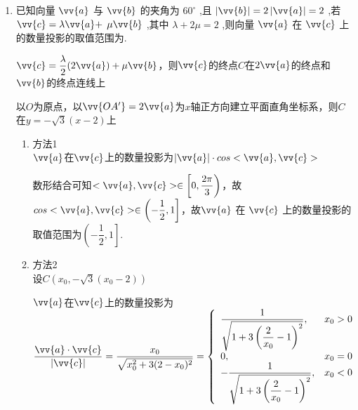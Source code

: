 
\begin{enumerate}
    \item 已知向量 $\vv{a}$ 与 $\vv{b}$ 的夹角为 ${60}^{ \circ  }$ ,且 $\left| \vv{b}\right|  = 2\left| \vv{a}\right|  = 2$ ,若 $\vv{c} = \lambda \vv{a} +$  $\mu \vv{b}$ ,其中 $\lambda  + {2\mu } = 2$ ,则向量 $\vv{a}$ 在 $\vv{c}$ 上的数量投影的取值范围为\blkda{$\left(-\dfrac{1}{2}, 1\right]$}.
    \begin{jieda}
        $\vv{c} = \dfrac{\lambda}{2}(2\vv{a})+\mu \vv{b}$，则$\vv{c}$的终点$C$在$2\vv{a}$的终点和$\vv{b}$的终点连线上

        以$O$为原点，以$\vv{OA'} = 2\vv{a}$为$x$轴正方向建立平面直角坐标系，则$C$在$y = -\sqrt{3}(x-2)$上
        \begin{enumerate}
            \item 方法1 \\
            $\vv{a}$在$\vv{c}$上的数量投影为$|\vv{a}|\cdot cos<\vv{a}, \vv{c}>$
            
            数形结合可知$<\vv{a}, \vv{c}> \in \left[0, \dfrac{2\pi}{3}\right)$，故$cos<\vv{a}, \vv{c}> \in \left(-\dfrac{1}{2}, 1\right]$，故$\vv{a}$ 在 $\vv{c}$ 上的数量投影的取值范围为$\left(-\dfrac{1}{2}, 1\right]$.
            \item 方法2 \\
            设$C(x_0, -\sqrt{3}(x_0-2))$
            
            $\vv{a}$在$\vv{c}$上的数量投影为$\dfrac{\vv{a}\cdot \vv{c}}{|\vv{c}|} = \dfrac{x_0}{\sqrt{x_0^2+3(2-x_0)^2}} = \left\{\begin{array}{ll}
                 \dfrac{1}{\sqrt{1+3\left(\dfrac{2}{x_0}-1\right)^2}}, & x_0 > 0  \\
                 0, & x_0 = 0 \\
                 -\dfrac{1}{\sqrt{1+3\left(\dfrac{2}{x_0}-1\right)^2}}, & x_0 < 0  
            \end{array}\right.$



\end{enumerate}
\end{jieda}
\end{enumerate}

